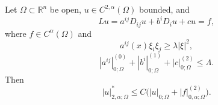 \begin{theorem}
\label{gt-ch06-thm-6-2}
Let $\Omega\subset\mathbb R^n$ be open, $u\in C^{2,\alpha}(\Omega)$ bounded, and
\[
Lu=a^{ij}D_{ij}u+b^iD_i u+cu=f,
\]
where $f\in C^\alpha(\Omega)$ and
\begin{equation}\tag{6.12}
a^{ij}(x)\xi_i\xi_j\ge\lambda|\xi|^2,
\end{equation}
\begin{equation}\tag{6.13}
|a^{ij}|_{0;\Omega}^{(0)}+|b^i|_{0;\Omega}^{(1)}+|c|_{0;\Omega}^{(2)}\le\Lambda.
\end{equation}
Then
\begin{equation}\tag{6.14}
|u|_{2,\alpha;\Omega}^*\le C\bigl(|u|_{0;\Omega}+|f|_{0,\alpha;\Omega}^{(2)}\bigr).
\end{equation}
\end{theorem}
